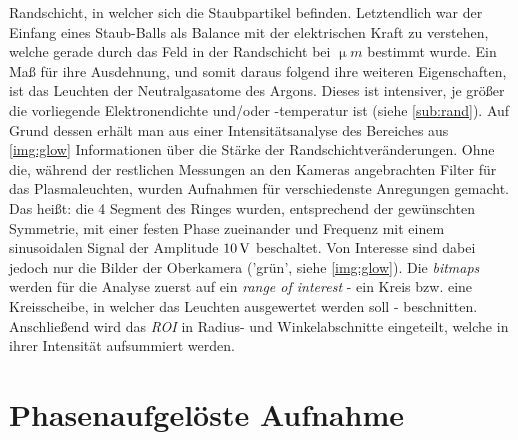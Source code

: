 \documentclass[numbers=noenddot,a4paper,notitlepage,twoside,BCOR15mm]{scrbook}
\newcommand{\degree}{^\circ}
\newcommand{\tilt}[1]{\textit{#1}}
\newcommand{\fett}[1]{\textbf{#1}}
\begin{document}
		Randschicht, in welcher sich die Staubpartikel befinden. Letztendlich war der Einfang eines Staub-Balls als Balance mit der elektrischen Kraft zu verstehen, welche gerade durch das Feld in der Randschicht bei $\unit{\upmu m}$ bestimmt wurde. Ein Maß für ihre Ausdehnung, und somit daraus folgend ihre weiteren Eigenschaften, ist das Leuchten der Neutralgasatome des Argons. Dieses ist intensiver, je größer die vorliegende Elektronendichte und/oder -temperatur ist (siehe \ref{sub:rand}).  Auf Grund dessen erhält man aus einer Intensitätsanalyse des Bereiches aus \autoref{img:glow} Informationen über die Stärke der Randschichtveränderungen. Ohne die, während der restlichen Messungen an den Kameras angebrachten Filter für das Plasmaleuchten, wurden Aufnahmen für verschiedenste Anregungen gemacht. Das heißt: die 4 Segment des Ringes wurden, entsprechend der gewünschten Symmetrie, mit einer festen Phase zueinander und Frequenz mit einem sinusoidalen Signal der Amplitude $\unit[10]{V}$ beschaltet. Von Interesse sind dabei jedoch nur die Bilder der Oberkamera ('grün', siehe \autoref{img:glow}). Die \tilt{bitmaps} werden für die Analyse zuerst auf ein \tilt{range of interest} - ein Kreis bzw. eine Kreisscheibe, in welcher das Leuchten ausgewertet werden soll - beschnitten. Anschließend wird das \tilt{ROI} in Radius- und Winkelabschnitte eingeteilt, welche in ihrer Intensität aufsummiert werden.


		\section{Phasenaufgelöste Aufnahme}\label{sec:phasen}
\end{document}
